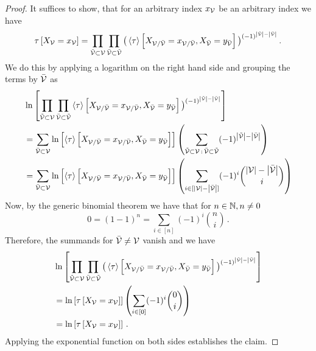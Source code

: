 \begin{proof}
    It suffices to show, that for an arbitrary index $x_{\mathcal{V}}$ be an arbitrary index we have
    \begin{align*}
        \tau\left[X_{\mathcal{V}}=x_{\mathcal{V}}\right]
        = \prod_{\tilde{\mathcal{V}}\subset\mathcal{V}} \prod_{\bar{\mathcal{V}}\subset\tilde{\mathcal{V}}}
        \big(\left\langle \tau\right\rangle \left[ X_{\mathcal{V}/\bar{\mathcal{V}}}=x_{\mathcal{V}/\bar{\mathcal{V}}}, X_{\bar{\mathcal{V}}} = y_{\bar{\mathcal{V}}} \right]\big)^{(-1)^{\left|\tilde{\mathcal{V}}\right|-\left|\bar{\mathcal{V}}\right|}} \, .
    \end{align*}
    We do this by applying a logarithm on the right hand side and grouping the terms by $\bar{\mathcal{V}}$ as
    \begin{align*}
        & \ln \left[ \prod_{\tilde{\mathcal{V}}\subset\mathcal{V}} \prod_{\bar{\mathcal{V}}\subset\tilde{\mathcal{V}}}
            \left\langle \tau\right\rangle \left[ X_{\mathcal{V}/\bar{\mathcal{V}}}=x_{\mathcal{V}/\bar{\mathcal{V}}}, X_{\bar{\mathcal{V}}} = y_{\bar{\mathcal{V}}} \right]\big)^{(-1)^{\left|\tilde{\mathcal{V}}\right|-\left|\bar{\mathcal{V}}\right|}} \right] \\
        & = \sum_{\bar{\mathcal{V}}\subset\mathcal{V}} \ln \left[ \left\langle \tau\right\rangle \left[ X_{\mathcal{V}/\bar{\mathcal{V}}}=x_{\mathcal{V}/\bar{\mathcal{V}}}, X_{\bar{\mathcal{V}}} = y_{\bar{\mathcal{V}}} \right] \right]
        \left( \sum_{\tilde{\mathcal{V}}\subset\mathcal{V} \,:\, \bar{\mathcal{V}}\subset \tilde{\mathcal{V}}} (-1)^{\left|\tilde{\mathcal{V}}\right|-\left|\bar{\mathcal{V}}\right|} \right) \\
        & =  \sum_{\bar{\mathcal{V}}\subset\mathcal{V}} \ln \left[ \left\langle \tau\right\rangle \left[ X_{\mathcal{V}/\bar{\mathcal{V}}}=x_{\mathcal{V}/\bar{\mathcal{V}}}, X_{\bar{\mathcal{V}}} = y_{\bar{\mathcal{V}}} \right] \right]
        \left( \sum_{i \in [\left|\mathcal{V}\right|-\left|\bar{\mathcal{V}}\right|]}  (-1)^{i}  \binom{\left|\mathcal{V}\right|-\left|\bar{\mathcal{V}}\right|}{i}  \right)
    \end{align*}
    Now, by the generic binomial theorem we have that for $n\in\mathbb{N}, n \neq 0$
    \[ 0 = (1-1)^n = \sum_{i \in [n]}  (-1)^{i}  \binom{n}{i}   \, . \]
    Therefore, the summands for $\bar{\mathcal{V}}\neq\mathcal{V}$ vanish and we have
    \begin{align*}
        & \ln \left[  \prod_{\tilde{\mathcal{V}}\subset\mathcal{V}} \prod_{\bar{\mathcal{V}}\subset\tilde{\mathcal{V}}}
            \big(\left\langle \tau\right\rangle \left[ X_{\mathcal{V}/\bar{\mathcal{V}}}=x_{\mathcal{V}/\bar{\mathcal{V}}}, X_{\bar{\mathcal{V}}} = y_{\bar{\mathcal{V}}} \right]\big)^{(-1)^{\left|\tilde{\mathcal{V}}\right|-\left|\bar{\mathcal{V}}\right|}}  \right] \\
        & = \ln \left[ \tau\left[X_{\mathcal{V}}=x_{\mathcal{V}}\right] \right]
        \left( \sum_{i \in [0]}  (-1)^{i}  \binom{0}{i}  \right) \\
        & = \ln \left[ \tau\left[X_{\mathcal{V}}=x_{\mathcal{V}}\right] \right] \, .
    \end{align*}
    Applying the exponential function on both sides establishes the claim.
\end{proof}

